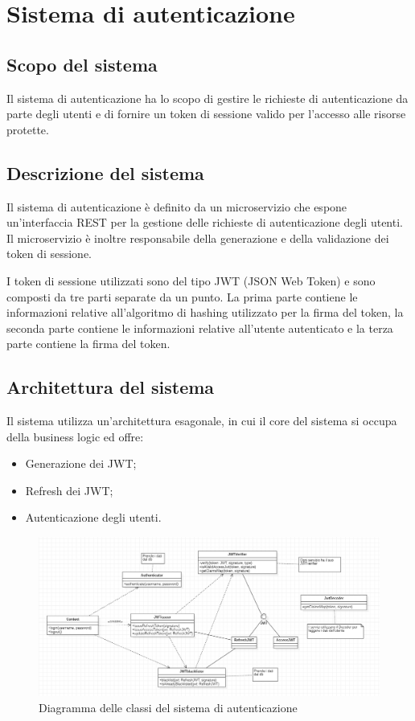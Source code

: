 \chapter{Sistema di autenticazione}


\section{Scopo del sistema}

Il sistema di autenticazione ha lo scopo di gestire le richieste di autenticazione da parte degli utenti e di fornire un token di sessione valido per l'accesso alle risorse protette.

\section{Descrizione del sistema}

Il sistema di autenticazione è definito da un microservizio che espone un'interfaccia REST per la gestione delle richieste di autenticazione degli utenti. Il microservizio è inoltre responsabile della generazione e della validazione dei token di sessione.

I token di sessione utilizzati sono del tipo JWT (JSON Web Token) e sono composti da tre parti separate da un punto. La prima parte contiene le informazioni relative all'algoritmo di hashing utilizzato per la firma del token, la seconda parte contiene le informazioni relative all'utente autenticato e la terza parte contiene la firma del token.

\section{Architettura del sistema}

Il sistema utilizza un'architettura esagonale, in cui il core del sistema si occupa della business logic ed offre:
\begin{itemize}
    \item Generazione dei JWT;
    \item Refresh dei JWT;
    \item Autenticazione degli utenti.
\end{itemize}

\begin{figure}[H]
    \centering
    \includegraphics[width=\textwidth]{img/classi_auth.png}
    \caption{Diagramma delle classi del sistema di autenticazione}
\end{figure}


